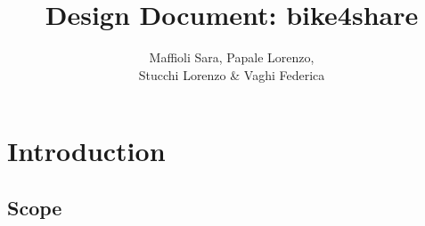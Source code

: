 \documentclass{article}
\title{Design Document: bike4share}
\author{Maffioli Sara, Papale Lorenzo, \\ Stucchi Lorenzo \& Vaghi Federica}
\begin{document}
\maketitle
\tableofcontents

\newpage

\section{Introduction}
\subsection{Scope}
\end{document}
